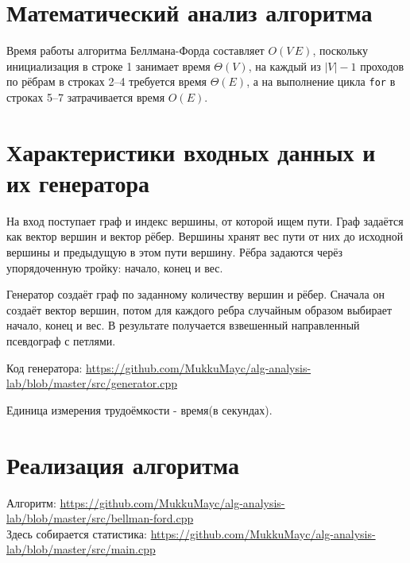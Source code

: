 \documentclass[a4paper,12pt]{article}
\begin{document}
\section{Математический анализ алгоритма}
  Время работы алгоритма Беллмана-Форда составляет $O(V\,E)$, поскольку
  инициализация в строке 1 занимает время $\Theta(V)$, на каждый из $|V| - 1$ 
  проходов по рёбрам в строках 2--4 требуется время $\Theta(E)$, а на выполнение цикла
  \texttt{for} в строках 5--7 затрачивается время $O(E)$.\cite{cormen}

\section{Характеристики входных данных и их генератора}
На вход поступает граф и индекс вершины, от которой ищем пути.
Граф задаётся как вектор вершин и вектор рёбер.
Вершины хранят вес пути от них до исходной вершины и предыдущую в этом пути вершину.
Рёбра задаются черёз упорядоченную тройку: начало, конец и вес.

Генератор создаёт граф по заданному количеству вершин и рёбер.
Сначала он создаёт вектор вершин, потом для каждого ребра случайным образом 
выбирает начало, конец и вес.
В результате получается взвешенный направленный псевдограф с петлями.

Код генератора: \url{https://github.com/MukkuMayc/alg-analysis-lab/blob/master/src/generator.cpp}

Единица измерения трудоёмкости - время(в секундах).
\section{Реализация алгоритма}
Алгоритм:
\url{https://github.com/MukkuMayc/alg-analysis-lab/blob/master/src/bellman-ford.cpp} \\
Здесь собирается статистика:
\url{https://github.com/MukkuMayc/alg-analysis-lab/blob/master/src/main.cpp}
\newpage
\end{document}
